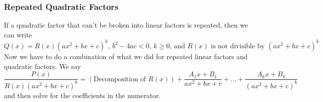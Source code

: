 \subsubsection{Repeated Quadratic Factors}
\noindent
If a quadratic factor that can't be broken into linear factors is repeated, then we can write
\begin{equation*}
	Q(x) = R(x)(ax^2+bx+c)^k\text{, }b^2-4ac < 0\text{, }k \geq 0\text{, and }R(x)\text{ is not divisible by }(ax^2+bx+c)^k
\end{equation*}
Now we have to do a combination of what we did for repeated linear factors and quadratic factors. We say
\begin{equation*}
	\frac{P(x)}{R(x)(ax^2+bx+c)^k}=\left(\text{Decomposition of }R(x)\right)+\frac{A_1x+B_1}{ax^2+bx+c}+\ldots+\frac{A_kx+B_k}{(ax^2+bx+c)^k}
\end{equation*}
and then solve for the coefficients in the numerator.

\ifodd{}\fi